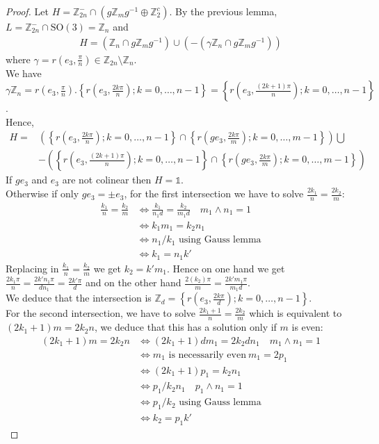 \documentclass[11pt,a4paper]{amsart}
\theoremstyle{definition}
\newcommand{\ZZ}{\mathbb{Z}}                %
\newcommand{\SO}{\mathrm{SO}}               %
\newcommand{\1}{\mathds{1}}		            %
\newcommand{\set}[1]{\left\{#1\right\}}     %
\begin{document}
\begin{proof}
Let $H=\ZZ_{2n}^- \cap (g\ZZ_m g^{-1}\oplus \ZZ_2^c)$. By the previous lemma, $L=\ZZ_{2n}^-\cap \SO(3)=\ZZ_n$ and
\begin{align*}
H=(\ZZ_n\cap g \ZZ_m g^{-1})\cup (-(\gamma\ZZ_n\cap g \ZZ_m g^{-1}))
\end{align*}
where $\gamma=r(e_3,\frac{\pi}{n})\in \ZZ_{2n}\setminus \ZZ_n$.\\
We have $\gamma \ZZ_n =r(e_3,\frac{\pi}{n}).\set{r(e_3,\frac{2k\pi}{n});k=0,\dotsc, n-1}=\set{r(e_3,\frac{(2k+1)\pi}{n});k=0,\dotsc,n-1}$.\\
Hence,
\begin{align*}
H=&\left(\set{r(e_3,\frac{2k\pi}{n});k=0,\dotsc, n-1}\cap \set{r(ge_3,\frac{2k\pi}{m});k=0,\dotsc, m-1}\right)\bigcup\\
       &-\left(\set{r(e_3,\frac{(2k+1)\pi}{n});k=0,\dotsc, n-1}\cap \set{r(ge_3,\frac{2k\pi}{m});k=0,\dotsc, m-1}\right)
\end{align*}
If $g e_3$ and $e_3$ are not colinear then $H=\1$.\\
Otherwise if only $ge_3=\pm e_3$, for the first intersection we have to solve $\displaystyle \frac{2k_1}{n}=\frac{2k_2}{m}$:
\begin{align*}
 \frac{k_1}{n}=\frac{k_2}{m} &\Leftrightarrow \frac{k_1}{n_1d}=\frac{k_2}{m_1d} \quad m_1\wedge n_1=1 \\& \Leftrightarrow k_1m_1=k_2n_1\\ & \Leftrightarrow n_1/k_1 \text{ using Gauss lemma} \\& \Leftrightarrow k_1=n_1k'
\end{align*}
Replacing in $ \frac{k_1}{n}=\frac{k_2}{m}$ we get $k_2=k'm_1$. Hence on one hand we get $\frac{2k_1\pi}{n}=\frac{2k'n_1\pi}{dn_1}=\frac{2k'\pi}{d}$ and on the other hand $\frac{2(k_2)\pi}{m}=\frac{2k'm_1\pi}{m_1d}$.\\
We deduce that the intersection is $\ZZ_d=\set{r(e_3,\frac{2k\pi}{d});k=0,\dotsc,n-1}$.
\\For the second intersection, we have to solve $\displaystyle \frac{2k_1+1}{n}=\frac{2k_2}{m}$ which is equivalent to $(2k_1+1)m=2k_2n$, we deduce that this has a solution only if $m$ is even:
\begin{align*}
(2k_1+1)m=2k_2n & \Leftrightarrow (2k_1+1)d m_1=2k_2d n_1 \quad m_1\wedge n_1=1 \\ & \Leftrightarrow m_1 \text{ is necessarily even} \ m_1=2p_1 \\& \Leftrightarrow (2k_1+1)p_1=k_2n_1\\ & \Leftrightarrow p_1/k_2 n_1 \quad p_1\wedge n_1=1 \\ & \Leftrightarrow p_1/k_2 \text{ using Gauss lemma} \\& \Leftrightarrow k_2=p_1k'

\end{align*}
\end{proof}
\end{document}
